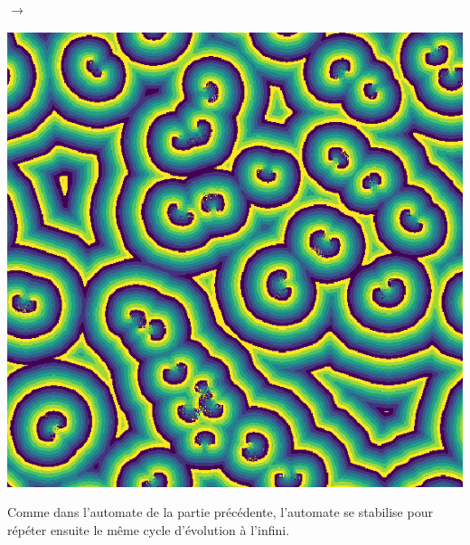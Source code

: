 \documentclass[12pt, a4paper]{article}
\begin{document}
\begin{center}
\begin{minipage}{.17\linewidth}
                \end{minipage}
                $\rightarrow$
                \begin{minipage}{.17\linewidth}
                    \includegraphics[scale=0.15]{img/part3/1/step4.png}
                \end{minipage}
            \end{center}
            Comme dans l'automate de la partie précédente, l'automate se stabilise pour répéter ensuite le même cycle d'évolution à l'infini.
        
        
        \newpage
\end{document}
